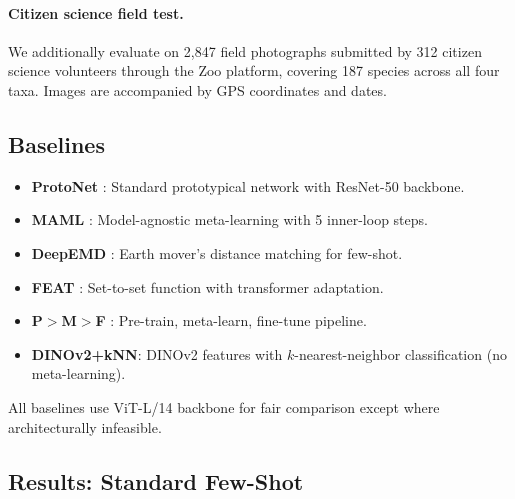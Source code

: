 \documentclass[11pt,a4paper]{article}
\begin{document}
\paragraph{Citizen science field test.} We additionally evaluate on
2{,}847 field photographs submitted by 312 citizen science volunteers
through the Zoo platform, covering 187 species across all four taxa.
Images are accompanied by GPS coordinates and dates.

\subsection{Baselines}

\begin{itemize}
  \item \textbf{ProtoNet} \citep{snell2017prototypical}: Standard
    prototypical network with ResNet-50 backbone.
  \item \textbf{MAML} \citep{finn2017model}: Model-agnostic
    meta-learning with 5 inner-loop steps.
  \item \textbf{DeepEMD} \citep{zhang2020deepemd}: Earth mover's
    distance matching for few-shot.
  \item \textbf{FEAT} \citep{ye2020few}: Set-to-set function with
    transformer adaptation.
  \item \textbf{P$>$M$>$F} \citep{hu2022pushing}: Pre-train, meta-learn,
    fine-tune pipeline.
  \item \textbf{DINOv2+kNN}: DINOv2 features with $k$-nearest-neighbor
    classification (no meta-learning).
\end{itemize}

All baselines use ViT-L/14 backbone for fair comparison except where
architecturally infeasible.

\subsection{Results: Standard Few-Shot}
\end{document}
